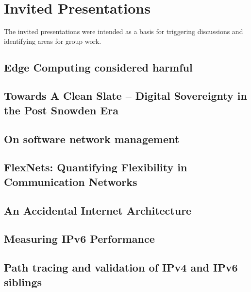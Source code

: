 \section{Invited Presentations}\label{sec:invited-presentations}

The invited presentations were intended as a basis for triggering discussions
and identifying areas for group work.

\subsection{Edge Computing considered harmful}


\subsection{Towards A Clean Slate -- Digital Sovereignty in the Post Snowden Era}


\subsection{On software network management}


\subsection{FlexNets: Quantifying Flexibility in Communication Networks}


\subsection{An Accidental Internet Architecture}


\subsection{Measuring IPv6 Performance}


\subsection{Path tracing and validation of IPv4 and IPv6 siblings}

